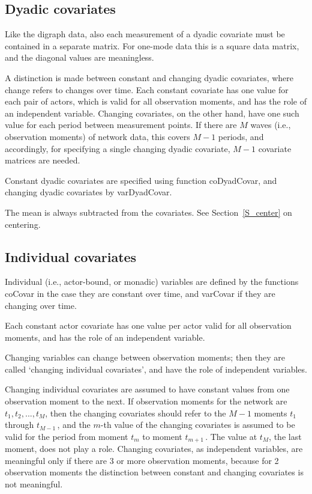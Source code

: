\documentclass[a4paper,fleqn,11pt]{article}
\newcommand{\+}{\, + \,}
\newcommand{\sfn}[1]{\textsf{#1}}
\begin{document}
{\subsection{Dyadic covariates}

Like the digraph data, also each measurement of a dyadic covariate
must be contained in a separate matrix.
For one-mode data this is a square data matrix,
and the diagonal values are meaningless.

A distinction is made between constant and changing dyadic
covariates, where change refers to changes over time. Each constant
covariate has one value for each pair of actors, which is valid for
all observation moments, and has the role of an independent
variable. Changing covariates, on the other hand, have one such
value for each period between measurement points. If there are $M$
waves (i.e., observation moments) of network data,
this covers $M-1$ periods, and accordingly,
for specifying a single changing dyadic covariate, $M-1$
covariate matrices are needed.

Constant dyadic covariates are specified using function
\sfn{coDyadCovar}, and changing dyadic covariates by \sfn{varDyadCovar}.

The mean is always subtracted from the covariates.
See Section~\ref{S_center} on centering.

\subsection{Individual covariates}

Individual (i.e., actor-bound, or monadic) variables
are defined by the functions
\sfn{coCovar} in the case they are constant over time,
and \sfn{varCovar} if they are changing over time.

Each constant actor covariate has one value per actor
valid for all observation moments, and has the role of an
independent variable.

Changing variables can change between observation moments;
then they are called `changing individual covariates',
and have the role of independent variables.

Changing individual covariates are assumed to have constant values from one
observation moment to the next. If observation moments for the
network are $t_1, t_2, ..., t_M$, then the changing covariates
should refer to the $M-1$ moments $t_1$ through $t_{M-1}\,$, and
the $m$-th value of the changing covariates is assumed to be valid
for the period from moment $t_m$ to moment $t_{m+1}\,$.
The value at $t_M$, the last moment, does not play a role.
Changing covariates, as independent variables, are meaningful
only if there are 3 or more observation moments,
because for 2 observation moments the distinction between
constant and changing covariates is not meaningful.

}
\end{document}
